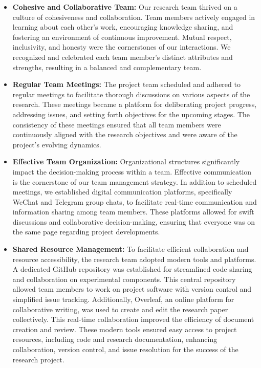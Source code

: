 \documentclass[conference]{IEEEtran}
\begin{document}
\begin{itemize}
    \item \textbf{Cohesive and Collaborative Team:} Our research team thrived on a culture of cohesiveness and collaboration. Team members actively engaged in learning about each other's work, encouraging knowledge sharing, and fostering an environment of continuous improvement. Mutual respect, inclusivity, and honesty were the cornerstones of our interactions. We recognized and celebrated each team member's distinct attributes and strengths, resulting in a balanced and complementary team.
    \item \textbf{Regular Team Meetings:} The project team scheduled and adhered to regular meetings to facilitate thorough discussions on various aspects of the research. These meetings became a platform for deliberating project progress, addressing issues, and setting forth objectives for the upcoming stages. The consistency of these meetings ensured that all team members were continuously aligned with the research objectives and were aware of the project's evolving dynamics.
    \item \textbf{Effective Team Organization:} Organizational structures significantly impact the decision-making process within a team. Effective communication is the cornerstone of our team management strategy. In addition to scheduled meetings, we established digital communication platforms, specifically WeChat and Telegram group chats, to facilitate real-time communication and information sharing among team members. These platforms allowed for swift discussions and collaborative decision-making, ensuring that everyone was on the same page regarding project developments. 
    \item \textbf{Shared Resource Management:} To facilitate efficient collaboration and resource accessibility, the research team adopted modern tools and platforms. A dedicated GitHub repository was established for streamlined code sharing and collaboration on experimental components. This central repository allowed team members to work on project software with version control and simplified issue tracking. Additionally, Overleaf, an online platform for collaborative writing, was used to create and edit the research paper collectively. This real-time collaboration improved the efficiency of document creation and review. These modern tools ensured easy access to project resources, including code and research documentation, enhancing collaboration, version control, and issue resolution for the success of the research project.
\end{itemize}
\end{document}
